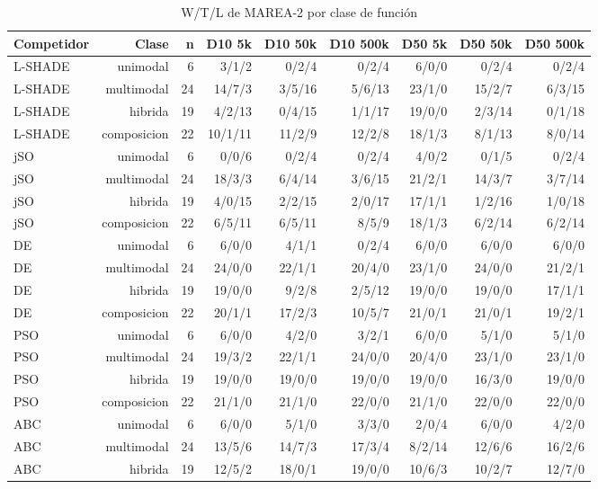 \begin{table}[ht]\centering\small
\caption{W/T/L de MAREA-2 por clase de función}
\begin{tabular}{lrrrrrrrr}
\toprule
Competidor & Clase & n & D10 5k & D10 50k & D10 500k & D50 5k & D50 50k & D50 500k \\
\midrule
L-SHADE & unimodal & 6 & 3/1/2 & 0/2/4 & 0/2/4 & 6/0/0 & 0/2/4 & 0/2/4 \\
L-SHADE & multimodal & 24 & 14/7/3 & 3/5/16 & 5/6/13 & 23/1/0 & 15/2/7 & 6/3/15 \\
L-SHADE & hibrida & 19 & 4/2/13 & 0/4/15 & 1/1/17 & 19/0/0 & 2/3/14 & 0/1/18 \\
L-SHADE & composicion & 22 & 10/1/11 & 11/2/9 & 12/2/8 & 18/1/3 & 8/1/13 & 8/0/14 \\
jSO & unimodal & 6 & 0/0/6 & 0/2/4 & 0/2/4 & 4/0/2 & 0/1/5 & 0/2/4 \\
jSO & multimodal & 24 & 18/3/3 & 6/4/14 & 3/6/15 & 21/2/1 & 14/3/7 & 3/7/14 \\
jSO & hibrida & 19 & 4/0/15 & 2/2/15 & 2/0/17 & 17/1/1 & 1/2/16 & 1/0/18 \\
jSO & composicion & 22 & 6/5/11 & 6/5/11 & 8/5/9 & 18/1/3 & 6/2/14 & 6/2/14 \\
DE & unimodal & 6 & 6/0/0 & 4/1/1 & 0/2/4 & 6/0/0 & 6/0/0 & 6/0/0 \\
DE & multimodal & 24 & 24/0/0 & 22/1/1 & 20/4/0 & 23/1/0 & 24/0/0 & 21/2/1 \\
DE & hibrida & 19 & 19/0/0 & 9/2/8 & 2/5/12 & 19/0/0 & 19/0/0 & 17/1/1 \\
DE & composicion & 22 & 20/1/1 & 17/2/3 & 10/5/7 & 21/0/1 & 21/0/1 & 19/2/1 \\
PSO & unimodal & 6 & 6/0/0 & 4/2/0 & 3/2/1 & 6/0/0 & 5/1/0 & 5/1/0 \\
PSO & multimodal & 24 & 19/3/2 & 22/1/1 & 24/0/0 & 20/4/0 & 23/1/0 & 23/1/0 \\
PSO & hibrida & 19 & 19/0/0 & 19/0/0 & 19/0/0 & 19/0/0 & 16/3/0 & 19/0/0 \\
PSO & composicion & 22 & 21/1/0 & 21/1/0 & 22/0/0 & 21/1/0 & 22/0/0 & 22/0/0 \\
ABC & unimodal & 6 & 6/0/0 & 5/1/0 & 3/3/0 & 2/0/4 & 6/0/0 & 4/2/0 \\
ABC & multimodal & 24 & 13/5/6 & 14/7/3 & 17/3/4 & 8/2/14 & 12/6/6 & 16/2/6 \\
ABC & hibrida & 19 & 12/5/2 & 18/0/1 & 19/0/0 & 10/6/3 & 10/2/7 & 12/7/0 \\

\end{tabular}
\end{table}
